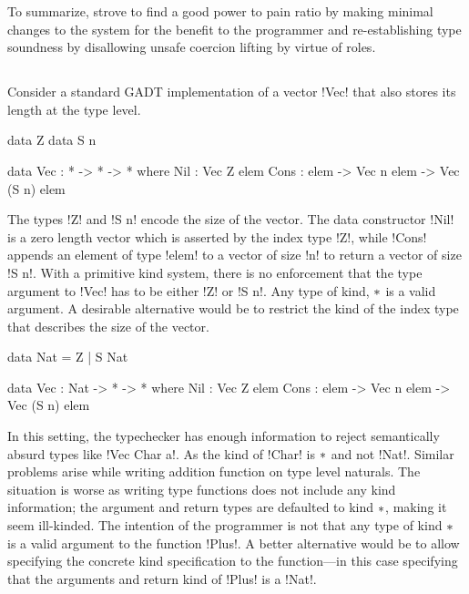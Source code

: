 \documentclass[screen,nonacm]{acmart}
\begin{document}
To summarize, \SFR strove to find a good power to pain ratio by making minimal changes to the system for the benefit to the programmer and re-establishing type soundness by disallowing unsafe coercion lifting by virtue of roles.

\subsection{\SFP}\label{sec:sfp} %
Consider a standard GADT implementation of a vector !Vec! that also stores its length at the type level.

\begin{minipage}[ht]{0.4\linewidth}
\begin{code}
        data Z
        data S n
\end{code}
\end{minipage}%
\begin{minipage}[ht]{0.4\linewidth}
\begin{code}
    data Vec : * -> * -> * where
       Nil : Vec Z elem
       Cons : elem -> Vec n elem -> Vec (S n) elem
\end{code}
\end{minipage}

The types !Z! and !S n! encode the size of the vector. The data
constructor !Nil! is a zero length vector which is asserted by the
index type !Z!, while !Cons! appends an element of type !elem! to a
vector of size !n! to return a vector of size !S n!. With a primitive
kind system, there is no enforcement that the type argument to !Vec!
has to be either !Z! or !S n!. Any type of kind, $\ast$ is a valid
argument. A desirable alternative would be to restrict the kind
of the index type that describes the size of the vector.

\begin{minipage}[ht]{0.4\linewidth}
\begin{code}
         data Nat = Z | S Nat
\end{code}
\end{minipage}%
\begin{minipage}[ht]{0.4\linewidth}
\begin{code}
     data Vec : Nat -> * -> * where
        Nil : Vec Z elem
        Cons : elem -> Vec n elem -> Vec (S n) elem
\end{code}
\end{minipage}

In this setting, the typechecker has enough information to reject
semantically absurd types like !Vec Char a!. As the kind of !Char! is
$\ast$ and not !Nat!. Similar problems arise while writing addition function on type level
naturals. The situation is worse as writing type functions does not
include any kind information; the argument and return types are
defaulted to kind $\ast$, making it seem ill-kinded. The intention of
the programmer is not that any type of kind $\ast$ is a valid
argument to the function !Plus!. A better alternative would be to
allow specifying the concrete kind specification to the function---in
this case specifying that the arguments and return kind of !Plus! is a
!Nat!.
\end{document}
